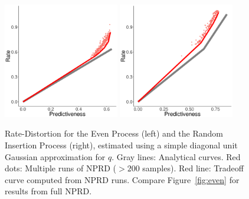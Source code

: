 \documentclass[entropy,article,submit,moreauthors,pdftex,10pt,a4paper]{Definitions/mdpi}
\begin{document}
\begin{figure}
\centering
\includegraphics[width=0.45\textwidth]{code/figures/even-info-noFlow.pdf}
\includegraphics[width=0.45\textwidth]{code/figures/rip-info-noFlow.pdf}

	\caption{Rate-Distortion for the Even Process (left) and the Random Insertion Process (right), estimated using a simple diagonal unit Gaussian approximation for $q$. Gray lines: Analytical curves. Red dots: Multiple runs of NPRD ($> 200$ samples). Red line: Tradeoff curve computed from NPRD runs. Compare Figure~\ref{fig:even} for results from full NPRD. }\label{fig:even-noFlow}
\end{figure}
\end{document}
